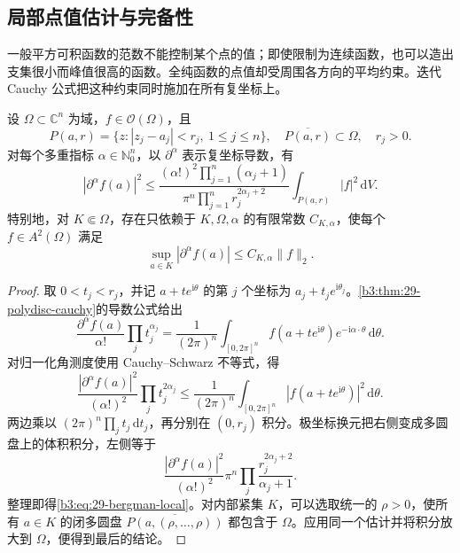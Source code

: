 \subsection{局部点值估计与完备性}
\label{b3:subsec:290602}

一般平方可积函数的范数不能控制某个点的值；即使限制为连续函数，也可以造出支集很小而峰值很高的函数。全纯函数的点值却受周围各方向的平均约束。迭代 Cauchy 公式把这种约束同时施加在所有复坐标上。

\begin{proposition}[多圆盘上的局部平方估计]\label{b3:prop:29-bergman-local}
设 \(\Omega\subset\mathbb C^n\) 为域，\(f\in\mathcal O(\Omega)\)，且
\[
 P(a,r)=\{z:|z_j-a_j|<r_j,\ 1\le j\le n\},
 \quad \overline{P(a,r)}\subset\Omega,
 \quad r_j>0.
\]
对每个多重指标 \(\alpha\in\mathbb N_0^n\)，以 \(\partial^\alpha\) 表示复坐标导数，有
\begin{equation}\label{b3:eq:29-bergman-local}
 |\partial^\alpha f(a)|^2
 \le
 \frac{(\alpha!)^2\prod_{j=1}^n(\alpha_j+1)}
      {\pi^n\prod_{j=1}^n r_j^{2\alpha_j+2}}
 \int_{P(a,r)}|f|^2\,\mathrm{d}V.
\end{equation}
特别地，对 \(K\Subset\Omega\)，存在只依赖于 \(K,\Omega,\alpha\) 的有限常数 \(C_{K,\alpha}\)，使每个 \(f\in A^2(\Omega)\) 满足
\[
 \sup_{a\in K}|\partial^\alpha f(a)|
 \le C_{K,\alpha}\|f\|_2.
\]
\end{proposition}
\begin{proof}
取 \(0<t_j<r_j\)，并记 \(a+t e^{\mathrm{i}\theta}\) 的第 \(j\) 个坐标为 \(a_j+t_je^{\mathrm{i}\theta_j}\)。\cref{b3:thm:29-polydisc-cauchy}的导数公式给出
\[
 \frac{\partial^\alpha f(a)}{\alpha!}\prod_jt_j^{\alpha_j}
 =\frac1{(2\pi)^n}\int_{[0,2\pi]^n}
 f(a+t e^{\mathrm{i}\theta})e^{-\mathrm{i}\alpha\cdot\theta}
 \,\mathrm{d}\theta.
\]
对归一化角测度使用 Cauchy--Schwarz 不等式，得
\[
 \frac{|\partial^\alpha f(a)|^2}{(\alpha!)^2}
       \prod_jt_j^{2\alpha_j}
 \le\frac1{(2\pi)^n}\int_{[0,2\pi]^n}
       |f(a+t e^{\mathrm{i}\theta})|^2\,\mathrm{d}\theta.
\]
两边乘以 \((2\pi)^n\prod_jt_j\,\mathrm{d}t_j\)，再分别在 \((0,r_j)\) 积分。极坐标换元把右侧变成多圆盘上的体积积分，左侧等于
\[
 \frac{|\partial^\alpha f(a)|^2}{(\alpha!)^2}
 \pi^n\prod_j\frac{r_j^{2\alpha_j+2}}{\alpha_j+1}.
\]
整理即得\eqref{b3:eq:29-bergman-local}。对内部紧集 \(K\)，可以选取统一的 \(\rho>0\)，使所有 \(a\in K\) 的闭多圆盘 \(\overline{P(a,(\rho,\ldots,\rho))}\) 都包含于 \(\Omega\)。应用同一个估计并将积分放大到 \(\Omega\)，便得到最后的结论。
\end{proof}

